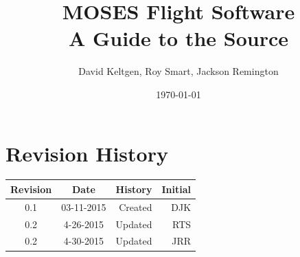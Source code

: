 \documentclass[11pt,titlepage]{article}
\title{MOSES Flight Software \\ A Guide to the Source}
\author{David Keltgen, Roy Smart, Jackson Remington}
\date{\today}
\begin{document}
\maketitle
\tableofcontents
\newpage

\section[Revisions]{Revision History}
	\begin{longtable}{|c|c|r|r|}
		\hline
		Revision	&	Date	&	\multicolumn{1}{c|}{History}	&	\multicolumn{1}{c|}{Initial}\\
		\hline
		0.1	&	03-11-2015	&	Created	& DJK	\\
		\hline
		0.2 & 4-26-2015 & Updated & RTS \\
		\hline
		0.2 & 4-30-2015 & Updated & JRR \\
		\hline

	\end{longtable}
	
\newpage
\end{document}
